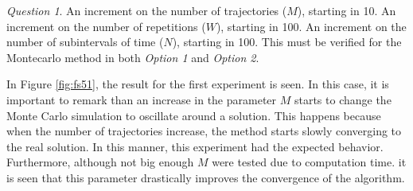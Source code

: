\documentclass[11pt]{article}
\theoremstyle{definition}
\theoremstyle{remark}
\theoremstyle{remark}
\newtheorem{question}{Question}
\begin{document}
\begin{question}
  An increment on the number of trajectories ($M$), starting in 10. An increment
  on the number of repetitions ($W$), starting in 100. An increment on the
  number of subintervals of time ($N$), starting in 100. This must be verified
  for the Montecarlo method in both \textit{Option 1} and \textit{Option 2}.
\end{question}

In Figure \ref{fig:fs51}, the result for the first experiment is seen. In this
case, it is important to remark than an increase in the parameter $M$ starts to
change the Monte Carlo simulation to oscillate around a solution. This happens
because when the number of trajectories increase, the method starts slowly
converging to the real solution. In this manner, this experiment had the
expected behavior. Furthermore, although not big enough $M$ were tested due to
computation time. it is seen that this parameter drastically improves the
convergence of the algorithm.
\end{document}
